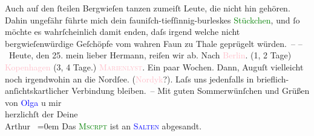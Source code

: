                Auch auf den ſteilen Bergwieſen tanzen zumeiſt Leute, die nicht hin gehören. Dahin
               ungefähr führte mich dein fauniſch-tiefſinnig-burleskes \textcolor{green}{Stückchen}{}, und ſo möchte es wahrſcheinlich damit {\pb}enden, daſs irgend
               welche nicht bergwieſenwürdige Geſchöpfe vom wahren Faun zu Thale geprügelt
               würden. –\pend
           \pstart
           \noindent{}– Heute, \introOben{}den 25.\introOben{} mein lieber Hermann, reiſen wir ab. Nach
                  \textcolor{pink}{Berlin}{}\ledrightnote{\textcolor{pink}{Berlin}}. (1, 2 Tage) \textcolor{pink}{Kopenhagen}{}\ledrightnote{\textcolor{pink}{Kopenhagen}} (3, 4 Tage.) \textcolor{pink}{\textsc{Marienlyst}}{}\ledrightnote{\textcolor{pink}{Marienlyst}}. Ein paar Wochen. Dann, Auguſt vielleicht noch irgendwohin an die Nordſee. (\textcolor{pink}{Nordyk}{}\ledrightnote{\textcolor{pink}{Graz}}?). Laſs
               uns jedenfalls in brieflich-anſichtskartlicher Verbindung bleiben. – \pend
           \pstart
           Mit guten Sommerwünſchen und {\pb}Grüßen von \textcolor{blue}{Olga}{}\ledrightnote{\textcolor{blue}{Olga Schnitzler}} u mir{\\[\baselineskip]}herzlichſt der Deine{\\[\baselineskip]}\spacefill\mbox{Arthur }\pend
           \leftskip=0em{}\pstart
           \noindent{}Das \textsc{\textcolor{green}{Mscrpt}{}} ist an \textsc{\textcolor{blue}{Salten}{}\ledrightnote{\textcolor{blue}{Felix Salten}}} abgesandt.\pend
           \endnumbering{}  
      